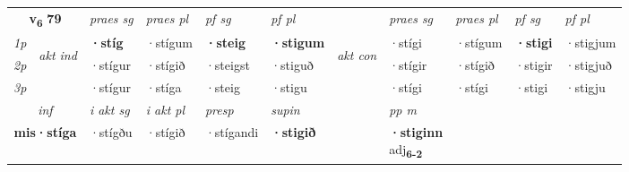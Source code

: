 \noindent
\begin{tabular}{lllllllllll} \toprule
\multicolumn{2}{c}{\textbf{v{\textsubscript{6}}} \Large{\textbf{79}}}  &  \textit{praes sg}  & \textit{praes pl}  &\textit{ pf sg} & \textit{pf pl} &  &  \textit{praes sg}  & \textit{praes pl}  & \textit{pf sg} & \textit{pf pl } \\*
	\cmidrule{3-6} \cmidrule{8-11}
 {\textit{1p}} & \multirow{3}{*}{\begin{turn}{90}\textit{akt ind}\end{turn}} & \textbf{·stíg} & ·stígum & \textbf{·steig} & \textbf{·stigum} & \multirow{3}{*}{\begin{turn}{90}\textit{akt con}\end{turn}} &·stígi & ·stígum & \textbf{·stigi} & ·stigjum\\*
 {\textit{2p}} &  &  ·stígur  & ·stígið & ·steigst & ·stiguð & & ·stígir & ·stígið & ·stigir & ·stigjuð \\*
{\textit{3p}} &  & ·stígur & ·stíga & ·steig & ·stigu & & ·stígi & ·stígi& ·stigi & ·stigju \\*
\cmidrule{3-6} \cmidrule{8-11}

   \multicolumn{2}{c}{\textit{inf}}  & \textit{i akt sg} & \textit{i akt pl}   & \textit{presp} & \textit{supin}  && \textit{pp m} \\*
  \multicolumn{2}{c}{\textbf{mis\allowbreak ·stíga}} & ·stígðu  & ·stígið   & ·stígandi &  \textbf{·stigið}  && \specialcell{\textbf{·stiginn} \\ adj\textbf{\textsubscript{6-2}}} \\*
\end{tabular}


